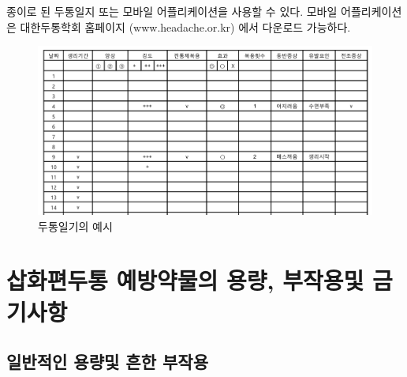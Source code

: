 \documentclass[]{book}
\begin{document}
종이로 된 두통일지 또는 모바일 어플리케이션을 사용할 수 있다. 모바일 어플리케이션은 대한두통학회 홈페이지 (www.headache.or.kr) 에서 다운로드 가능하다.

\begin{figure}
\centering
\includegraphics{static/DiaryExample.png}
\caption{두통일기의 예시}
\end{figure}

\hypertarget{section-22}{%
\chapter{삽화편두통 예방약물의 용량, 부작용및 금기사항}\label{section-22}}

\hypertarget{section-23}{%
\section{일반적인 용량및 흔한 부작용}\label{section-23}}
\end{document}
